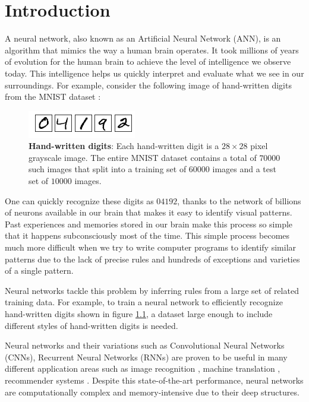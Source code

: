 \chapter{Introduction}\label{chap:introduction}

A neural network, also known as an Artificial Neural Network (ANN), is an algorithm that mimics the way a human brain operates. It took millions of years of evolution for the human brain to achieve the level of intelligence we observe today. This intelligence helps us quickly interpret and evaluate what we see in our surroundings. For example, consider the following image of hand-written digits from the MNIST dataset \cite{mnist}:

\begin{figure}[h]
	\centering
	\includegraphics[width=0.5\linewidth]{images/introduction/digits.png}
	\caption[Hand-written digits]%
	{\textbf{Hand-written digits}: Each hand-written digit is a $28\times28$ pixel grayscale image. The entire MNIST dataset contains a total of $70000$ such images that split into a training set of $60000$ images and a test set of $10000$ images.}
	\label{fig:digits}
\end{figure}

One can quickly recognize these digits as $04192$, thanks to the network of billions of neurons available in our brain that makes it easy to identify visual patterns. Past experiences and memories stored in our brain make this process so simple that it happens subconsciously most of the time. This simple process becomes much more difficult when we try to write computer programs to identify similar patterns due to the lack of precise rules and hundreds of exceptions and varieties of a single pattern.

Neural networks tackle this problem by inferring rules from a large set of related training data. For example, to train a neural network to efficiently recognize hand-written digits shown in figure \ref{fig:digits}, a dataset large enough to include different styles of hand-written digits is needed.

Neural networks and their variations such as Convolutional Neural Networks (CNNs), Recurrent Neural Networks (RNNs) are proven to be useful in many different application areas such as image recognition \cite{image_recon}, machine translation \cite{russian}, recommender systems \cite{recommender}. Despite this state-of-the-art performance, neural networks are computationally complex and memory-intensive due to their deep structures.

